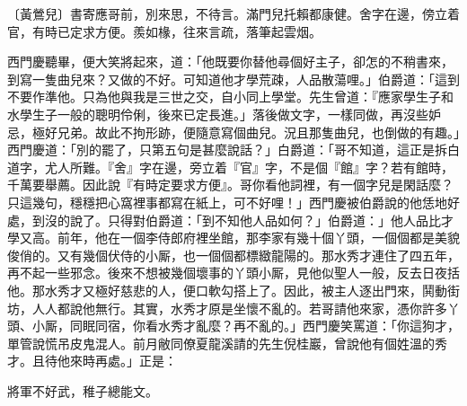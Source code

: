 \begin{myquote}
{\markfont\small〔黃鶯兒〕}書寄應哥前，別來思，不待言。滿門兒托賴都康健。舍字在邊，傍立着官，有時已定求方便。羨如椽，往來言疏，落筆起雲烟。
\end{myquote}

西門慶聽畢，便大笑將起來，道：「他既要你替他尋個好主子，卻怎的不稍書來，到寫一隻曲兒來？又做的不好。可知道他才學荒疎，人品散蕩哩。」伯爵道：「這到不要作準他。只為他與我是三世之交，自小同上學堂。先生曾道：『應家學生子和水學生子一般的聰明伶俐，後來已定長進。」落後做文字，一樣同做，再沒些妒忌，極好兄弟。故此不拘形跡，{}便隨意寫個曲兒。況且那隻曲兒，也倒做的有趣。」西門慶道：「別的罷了，只第五句是甚麼說話？」白爵道：「哥不知道，這正是拆白道字，尤人所難。『舍』字在邊，旁立着『官』字，不是個『館』字？若有館時，千萬要舉薦。因此說『有時定要求方便』。哥你看他詞裡，有一個字兒是閑話麼？只這幾句，穩穩把心窩裡事都寫在紙上，可不好哩！」西門慶被伯爵說的他恁地好處，到沒的說了。只得對伯爵道：「到不知他人品如何？」伯爵道：」他人品比才學又高。前年，他在一個李侍郎府裡坐館，那李家有幾十個丫頭，一個個都是美貌俊俏的。又有幾個伏侍的小厮，也一個個都標緻龍陽的。那水秀才連住了四五年，再不起一些邪念。後來不想被幾個壞事的丫頭小厮，見他似聖人一般，反去日夜括他。那水秀才又極好慈悲的人，便口軟勾搭上了。{}因此，被主人逐出門來，鬨動街坊，人人都說他無行。其實，水秀才原是坐懷不亂的。若哥請他來家，憑你許多丫頭、小厮，同眠同宿，你看水秀才亂麼？再不亂的。」西門慶笑罵道：「你這狗才，單管說慌吊皮鬼混人。前月敝同僚夏龍溪請的先生倪桂巖，曾說他有個姓溫的秀才。且待他來時再處。」正是：

\begin{myquote}
將軍不好武，稚子總能文。
\end{myquote}



